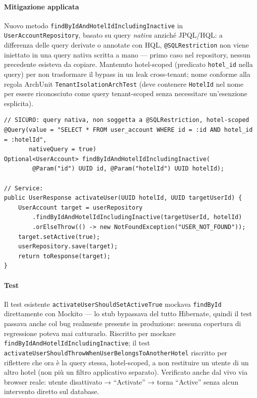﻿\documentclass[a4paper,12pt]{report}
\begin{document}
\paragraph{Mitigazione applicata}
Nuovo metodo \texttt{findByIdAndHotelIdIncludingInactive} in
\texttt{UserAccountRepository}, basato su query \emph{nativa} anziché
JPQL/HQL: a differenza delle query derivate o annotate con HQL,
\texttt{@SQLRestriction} non viene iniettato in una query nativa scritta a
mano --- primo caso nel repository, nessun precedente esisteva da copiare.
Mantenuto hotel-scoped (predicato \texttt{hotel\_id} nella query) per non
trasformare il bypass in un leak cross-tenant; nome conforme alla regola
ArchUnit \texttt{TenantIsolationArchTest} (deve contenere \texttt{HotelId} nel
nome per essere riconosciuto come query tenant-scoped senza necessitare
un'esenzione esplicita).

\begin{securebox}[title={Codice Sicuro --- UserAccountRepository.java / UserManagementServiceImpl.java (fix)}]
\begin{lstlisting}[style=java]
// SICURO: query nativa, non soggetta a @SQLRestriction, hotel-scoped
@Query(value = "SELECT * FROM user_account WHERE id = :id AND hotel_id = :hotelId",
       nativeQuery = true)
Optional<UserAccount> findByIdAndHotelIdIncludingInactive(
        @Param("id") UUID id, @Param("hotelId") UUID hotelId);

// Service:
public UserResponse activateUser(UUID hotelId, UUID targetUserId) {
    UserAccount target = userRepository
        .findByIdAndHotelIdIncludingInactive(targetUserId, hotelId)
        .orElseThrow(() -> new NotFoundException("USER_NOT_FOUND"));
    target.setActive(true);
    userRepository.save(target);
    return toResponse(target);
}
\end{lstlisting}
\end{securebox}

\paragraph{Test}
Il test esistente \texttt{activateUserShouldSetActiveTrue} mockava
\texttt{findById} direttamente con Mockito --- lo stub bypassava del tutto
Hibernate, quindi il test passava anche col bug realmente presente in
produzione: nessuna copertura di regressione poteva mai catturarlo. Riscritto
per mockare \texttt{findByIdAndHotelIdIncludingInactive}; il test
\texttt{activateUserShouldThrowWhenUserBelongsToAnotherHotel} riscritto per
riflettere che ora è la query stessa, hotel-scoped, a non restituire un
utente di un altro hotel (non più un filtro applicativo separato). Verificato
anche dal vivo via browser reale: utente disattivato → ``Activate'' → torna
``Active'' senza alcun intervento diretto sul database.
\end{document}
